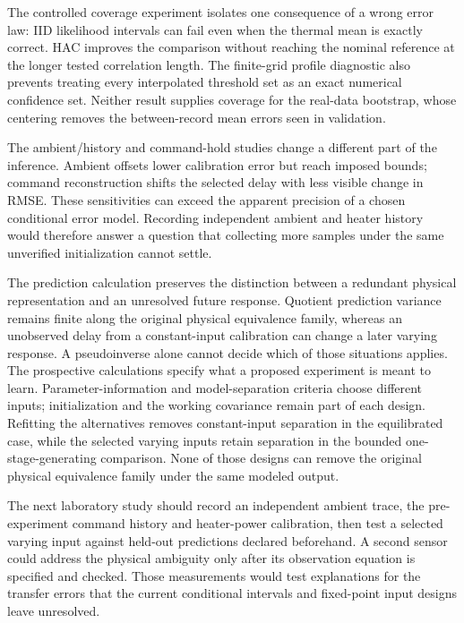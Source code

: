 \documentclass[11pt]{article}
\begin{document}
The controlled coverage experiment isolates one consequence of a wrong error
law: IID likelihood intervals can fail even when the thermal mean is exactly
correct. HAC improves the comparison without reaching the nominal reference
at the longer tested correlation length. The finite-grid profile diagnostic
also prevents treating every interpolated threshold set as an exact numerical
confidence set. Neither result supplies coverage for the real-data bootstrap,
whose centering removes the between-record mean errors seen in validation.

The ambient/history and command-hold studies change a different part of the
inference. Ambient offsets lower calibration error but reach imposed bounds;
command reconstruction shifts the selected delay with less visible change in
RMSE. These sensitivities can exceed the apparent precision of a chosen
conditional error model. Recording independent ambient and heater history would
therefore answer a question that collecting more samples under the same
unverified initialization cannot settle.

The prediction calculation preserves the distinction between a redundant
physical representation and an unresolved future response. Quotient prediction
variance remains finite along the original physical equivalence family, whereas
an unobserved delay from a constant-input calibration can change a later varying
response. A pseudoinverse alone cannot decide which of those situations applies.
The prospective calculations specify what a proposed experiment is meant to
learn. Parameter-information and model-separation criteria choose different
inputs; initialization and the working covariance remain part of each design.
Refitting the alternatives removes constant-input separation in the equilibrated
case, while the selected varying inputs retain separation in the bounded
one-stage-generating comparison. None of those designs can remove the original
physical equivalence family under the same modeled output.

The next laboratory study should record an independent ambient trace, the
pre-experiment command history and heater-power calibration, then test a
selected varying input against held-out predictions declared beforehand. A
second sensor could address the physical ambiguity only after its observation
equation is specified and checked. Those measurements would test explanations
for the transfer errors that the current conditional intervals and fixed-point
input designs leave unresolved.
\end{document}
